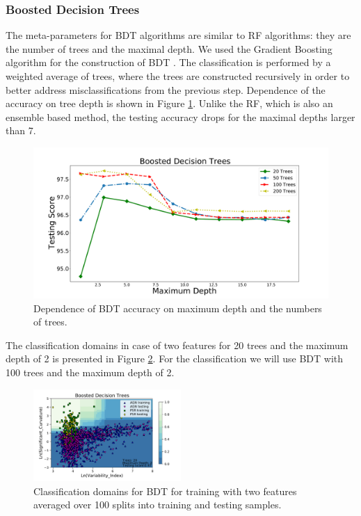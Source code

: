 \subsubsection{Boosted Decision Trees}

The meta-parameters for BDT algorithms are similar to RF algorithms: they are the number of trees and the maximal depth.
We used the Gradient Boosting algorithm for the construction of BDT \citep{gb}.
The classification is performed by a weighted average of trees, where the trees are constructed recursively in order to better address 
misclassifications from the previous step. 
Dependence of the accuracy on tree depth is shown in Figure \ref{fig:BDT_depth}. 
Unlike the RF, which is also an ensemble based method, the testing accuracy drops for the maximal depths larger than 7. 


\begin{figure}[h]
\includegraphics[width=\twopicsp\textwidth]{plots/bdt_train_assocnewfeats.pdf}
\caption{Dependence of BDT accuracy on maximum depth and the numbers of trees.}
\label{fig:BDT_depth}
\end{figure}

The classification domains in case of two features for 20 trees and the maximum depth of 2 is presented in Figure \ref{fig:BDT_domains}. 
For the classification we will use BDT with 100 trees and the maximum depth of 2.


\begin{figure}[h]
\includegraphics[width=0.5\textwidth]{plots/classification_domains/bdt_20_2.pdf}
\caption{Classification domains for BDT for training with two features 
averaged over 100 splits into training and testing samples.
}
\label{fig:BDT_domains}
\end{figure}



